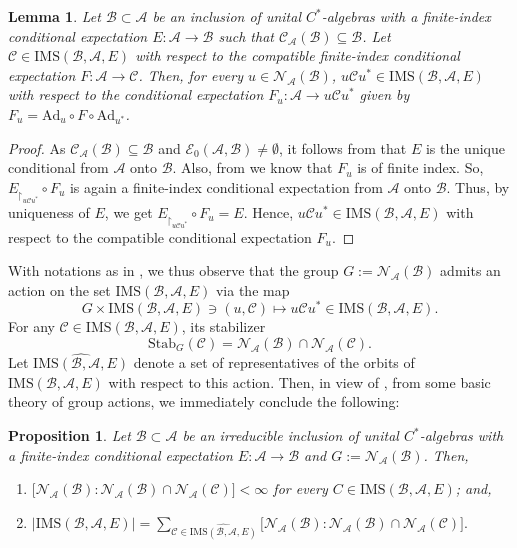 \documentclass{amsart}
\numberwithin{equation}{section}
\newcommand{\IMS}{\mathrm{IMS}}
\newcommand{\1}{\mathbf{1}}
\newcommand{\mA}{\mathcal{A}}
\newcommand{\mB}{\mathcal{B}}
\newcommand{\mC}{\mathcal{C}}
\newcommand{\mN}{\mathcal{N}}
\newtheorem{lemma}[theorem]{Lemma}
\newtheorem{proposition}[theorem]{Proposition}
\begin{document}
\begin{lemma}\label{IMS-elements}
  Let $\mB\subset \mA$ be an inclusion of unital $C^*$-algebras with a 
  finite-index conditional expectation $E: \mA\rightarrow \mB$ such that
  $\mC_{\mA}(\mB) \subseteq \mB$.  Let  $\mC\in \IMS(\mB, \mA, E)$
  with respect to the compatible finite-index conditional expectation
  $F: \mA\rightarrow \mC$. Then, for every $u\in \mN_{\mA}(\mB)$, $u\mC
  u^*\in \IMS(\mB, \mA, E)$ with respect to the conditional expectation
  $F_u: \mA\rightarrow u\mC u^*$ given by $F_u= \mathrm{Ad}_u\circ
  F\circ \mathrm{Ad}_{u^*}$.
\end{lemma}
\begin{proof}
As $\mC_{\mA}(\mB)  \subseteq \mB$ and $\mathcal{E}_0(\mA , \mB) \neq
\emptyset$, it follows from \cite[Corollary 1.4.3]{Wat} that $E$ is
the unique  conditional from $ \mA$ onto $ \mB$. Also,
from \cite[Lemma 2.8(1)]{GS} we know that $F_u$ is of finite
index. So, $E_{\restriction_{u\mC u^*}}\circ F_u$ is again a finite-index
conditional expectation from $\mA$ onto $\mB$. Thus, by uniqueness of
$E$, we get $E_{\restriction_{u\mC u^*}}\circ F_u=E$. Hence, $u\mC u^*\in
\IMS(\mB, \mA, E)$ with respect to the compatible conditional
expectation $F_u$.
\end{proof}
  With notations as in , we thus observe that the group
  $G:=\mN_{\mA}(\mB)$ admits an action on the set $\IMS(\mB, \mA, E)$ via
  the map
  \[
 G \times \IMS(\mB, \mA, E) \ni (u, \mC) \mapsto u\mC
  u^*\in \IMS(\mB, \mA, E).
  \]
For any $\mC\in \IMS(\mB, \mA, E)$, its stabilizer
\[
\mathrm{Stab}_G(\mC)= \mN_{\mA}(\mB)\cap \mN_{\mA}(\mC).
\]
  Let $\widehat{\IMS(\mB, \mA, E)}$ denote a set of representatives of
  the orbits of $\IMS(\mB, \mA, E)$ with respect to this action. Then, in
  view of , from some basic theory of group actions,
  we immediately conclude the following:

\begin{proposition}\label{IMS-cardinality}
Let $\mB\subset \mA$ be an irreducible inclusion of unital
$C^*$-algebras with a finite-index conditional expectation $E:
\mA\rightarrow \mB$ and $G:=\mN_{\mA}(\mB)$. Then,
\begin{enumerate}
\item $\big[\mN_{\mA}(\mB) : \mN_{\mA}(\mB)\cap \mN_{\mA}(\mC)\big] < \infty$
  for every $C\in \IMS(\mB, \mA, E)$; and,
\item \( \big|\IMS(\mB, \mA, E)\big|= \sum_{\mC\in \widehat{\IMS(\mB,
    \mA, E)}} \big[\mN_{\mA}(\mB) : \mN_{\mA}(\mB)\cap \mN_{\mA}(\mC)\big].
  \)
\end{enumerate}
\end{proposition}
\end{document}
